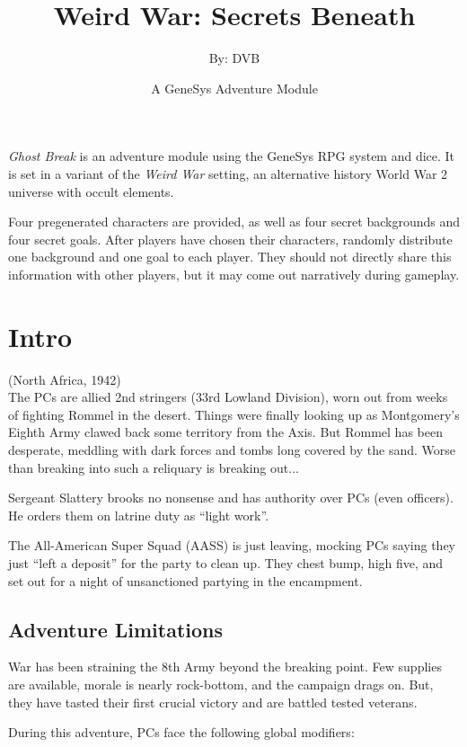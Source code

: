 \documentclass{book}
\title{Weird War: Secrets Beneath}
\author{By: DVB}
\date{A GeneSys Adventure Module}
\newcommand{\gb}{\emph{Ghost Break} }
\begin{document}
\maketitle

\begin{multicols}{2}

\gb is an adventure module using the GeneSys RPG system and dice.  It is set in a variant of the \emph{Weird War} setting, an alternative history World War 2 universe with occult elements.

Four pregenerated characters are provided, as well as four secret backgrounds and four secret goals.  After players have chosen their characters, randomly distribute one background and one goal to each player.  They should not directly share this information with other players, but it may come out narratively during gameplay.

\section{Intro}
(North Africa, 1942)\\

    The PCs are allied 2nd stringers (33rd Lowland Division), worn out from weeks of fighting Rommel in the desert.  Things were finally looking up as Montgomery's Eighth Army clawed back some territory from the Axis.  But Rommel has been desperate, meddling with dark forces and tombs long covered by the sand.  Worse than breaking into such a reliquary is breaking out...

    Sergeant Slattery brooks no nonsense and has authority over PCs (even officers).  He orders them on latrine duty as ``light work''.

    The All-American Super Squad (AASS) is just leaving, mocking PCs saying they just ``left a deposit'' for the party to clean up.  They chest bump, high five, and set out for a night of unsanctioned partying in the encampment. 

\subsection{Adventure Limitations}

    War has been straining the 8th Army beyond the breaking point.  Few supplies are available, morale is nearly rock-bottom, and the campaign drags on.  But, they have tasted their first crucial victory and are battled tested veterans.
    
    During this adventure, PCs face the following global modifiers:


\end{multicols}
\end{document}
